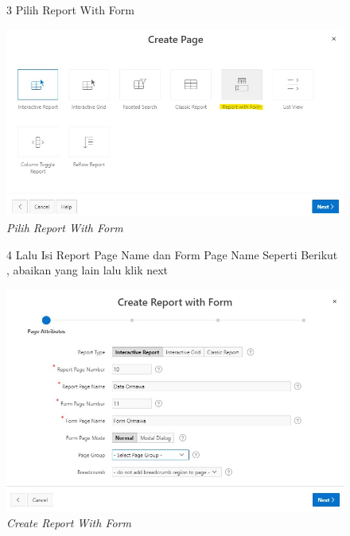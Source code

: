 \begin{itemize}
        \begin{figure}[!htbp]
        \item[3]Pilih Report With Form
        \begin{center}
        \includegraphics[scale=0.5]{figures/pilih_report_with_form.jpg}
        \caption{\textit{Pilih Report With Form}}
        \end{center}
        \end{figure}
        
        \begin{figure}[!htbp]
        \item[4]Lalu Isi Report Page Name dan Form Page Name Seperti Berikut , abaikan yang lain lalu klik next
        \begin{center}
        \includegraphics[scale=0.5]{figures/isi_sesuai_kebutuhan_tabel_dan_form_yg_akan_digunakan.jpg}
        \caption{\textit{Create Report With Form}}
        \end{center}
        \end{figure}
        

\end{itemize}
